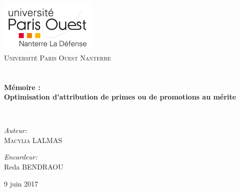 \begin{titlepage}
\begin{center}

\includegraphics[width=0.35\textwidth]{./log_nanterre}~\\[1cm]

\textsc{\LARGE Université Paris Ouest Nanterre}\\[1.5cm]

\textsc{\Large }\\[0.5cm]

\HRule \\[0.4cm]

{\huge \bfseries Mémoire : \\
Optimisation d'attribution de primes ou de promotions au mérite  \\[0.4cm] }

\HRule \\[1.5cm]

\begin{minipage}{0.4\textwidth}
\begin{flushleft} \large
\emph{Auteur:}\\
\textsc{Macylia LALMAS}\\
\end{flushleft}
\end{minipage}
\begin{minipage}{0.4\textwidth}
\begin{flushright} \large
\emph{Encardeur:} \\
Reda \textsc{BENDRAOU}\\
\end{flushright}
\end{minipage}

\vfill

{\large 9 juin 2017}

\end{center}
\end{titlepage}